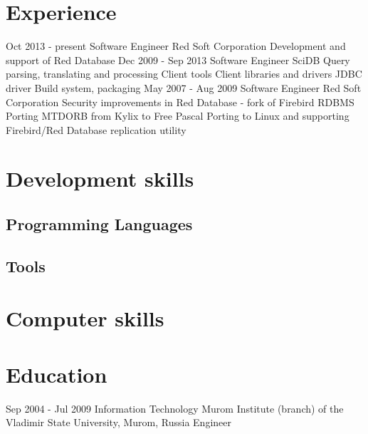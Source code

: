 \documentclass[11pt,a4paper]{moderncv}
\begin{document}
\section{Experience}
\cventry
  {Oct 2013 - present}
  {Software Engineer}
  {Red Soft Corporation}
  {}{}
  {
    Development and support of Red Database}
\cventry 
  {Dec 2009 - Sep 2013}
  {Software Engineer}
  {SciDB}
  {}{}
  {Query parsing, translating and processing\newline{}
   Client tools\newline{}
   Client libraries and drivers\newline{}
   JDBC driver\newline{}
   Build system, packaging}
\cventry
  {May 2007 - Aug 2009}
  {Software Engineer}
  {Red Soft Corporation}
  {}{}
  {
    Security improvements in Red Database - fork of Firebird RDBMS\newline{}
    Porting MTDORB from Kylix to Free Pascal\newline{}
    Porting to Linux and supporting Firebird/Red Database replication utility
  }

\section{Development skills}
\subsection{Programming Languages}
\subsection{Tools}

\section{Computer skills}

\section{Education}
\cventry
  {Sep 2004 -  Jul 2009}
  {Information Technology}
  {Murom Institute (branch) of the Vladimir State University, Murom, Russia}
  {}{}
  {Engineer}
\end{document}
